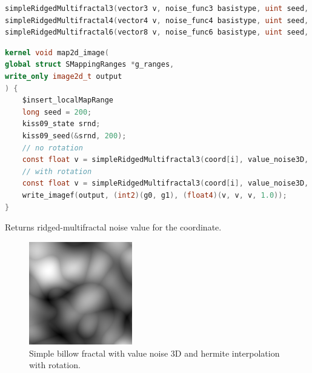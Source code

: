 \begin{lstlisting}[caption={Definition of simple brownian motion fractal functions},label={lst:simple_redgedmf3_definition},language=OpenCL]
simpleRidgedMultifractal3(vector3 v, noise_func3 basistype, uint seed, interp_func interp, random_func rnd, void *srnd, uint numoctaves, REAL frequency, bool rot);
simpleRidgedMultifractal4(vector4 v, noise_func4 basistype, uint seed, interp_func interp, random_func rnd, void *srnd, uint numoctaves, REAL frequency, bool rot);
simpleRidgedMultifractal6(vector8 v, noise_func6 basistype, uint seed, interp_func interp, random_func rnd, void *srnd, uint numoctaves, REAL frequency, bool rot);
\end{lstlisting}

\begin{lstlisting}[caption={Example for simple brownian motion fractal functions},label={lst:simple_redgedmf3_example},language=OpenCL]
kernel void map2d_image(
global struct SMappingRanges *g_ranges,
write_only image2d_t output
) {
    $insert_localMapRange
    long seed = 200;
    kiss09_state srnd;
    kiss09_seed(&srnd, 200);
    // no rotation
    const float v = simpleRidgedMultifractal3(coord[i], value_noise3D, 200, noInterp, random_kiss09, &srnd, 3, 0.125, false);
    // with rotation
    const float v = simpleRidgedMultifractal3(coord[i], value_noise3D, 200, noInterp, random_kiss09, &srnd, 3, 0.125, true);
    write_imagef(output, (int2)(g0, g1), (float4)(v, v, v, 1.0));
}
\end{lstlisting}

Returns ridged-multifractal noise value for the coordinate.

\begin{figure}[h]
\centering
\includegraphics[width=0.4\textwidth]{out/simpleBillow3/simpleBillow3_value_noise3D_hermiteInterp_rot.png}
\caption{Simple billow fractal with value noise 3D and hermite interpolation with rotation.}
\label{fig:simple_billow3_value_noise3D_hermiteInterp_rot}
\end{figure}

